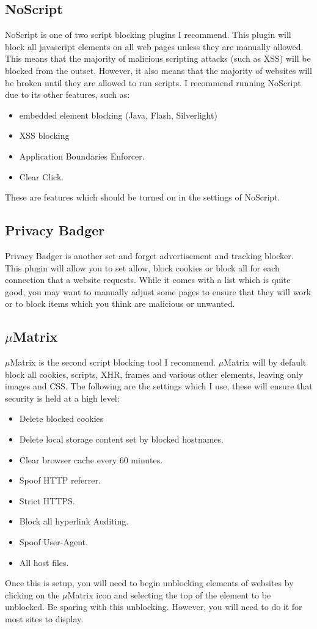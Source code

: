 		\subsection{NoScript}
			NoScript is one of two script blocking plugins I recommend.
			This plugin will block all javascript elements on all web pages unless they are manually allowed.
			This means that the majority of malicious scripting attacks (such as XSS) will be blocked from the outset.
			However, it also means that the majority of websites will be broken until they are allowed to run scripts.
			I recommend running NoScript due to its other features, such as:
			\begin{itemize}
				\item embedded element blocking (Java, Flash, Silverlight)
				\item XSS blocking
				\item Application Boundaries Enforcer.
				\item Clear Click.
			\end{itemize}
			These are features which should be turned on in the settings of NoScript.

		\subsection{Privacy Badger}
			Privacy Badger is another set and forget advertisement and tracking blocker.
			This plugin will allow you to set allow, block cookies or block all for each connection that a website requests.
			While it comes with a list which is quite good, you may want to manually adjust some pages to ensure that they will work or to block items which you think are malicious or unwanted.
		\subsection{$\mu{}$Matrix}
			$\mu$Matrix is the second script blocking tool I recommend.
			$\mu{}$Matrix will by default block all cookies, scripts, XHR, frames and various other elements, leaving only images and CSS.
			The following are the settings which I use, these will ensure that security is held at a high level:
			\begin{itemize}
				\item Delete blocked cookies
				\item Delete local storage content set by blocked hostnames.
				\item Clear browser cache every 60 minutes.
				\item Spoof HTTP referrer.
				\item Strict HTTPS.
				\item Block all hyperlink Auditing.
				\item Spoof User-Agent.
				\item All host files.
			\end{itemize}
			Once this is setup, you will need to begin unblocking elements of websites by clicking on the $\mu{}$Matrix icon and selecting the top of the element to be unblocked.
			Be sparing with this unblocking. However, you will need to do it for most sites to display.

